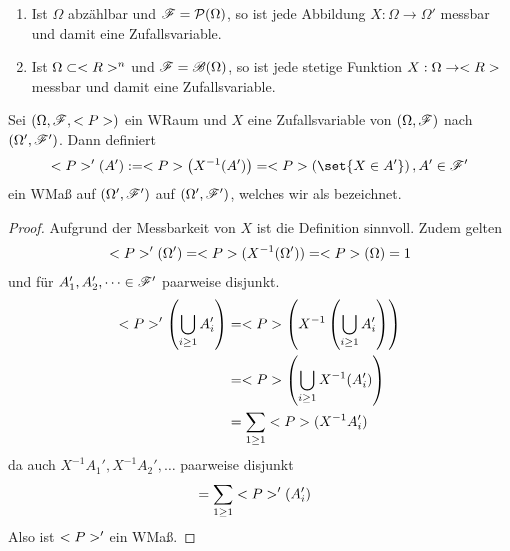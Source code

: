 \begin{example}
	\begin{enumerate}
		\item Ist $\Omega$ abzählbar und $\mathscr{F} = \mathcal{P}(\Omega)$, so ist jede Abbildung $X: \Omega \to \Omega'$ messbar und damit eine Zufallsvariable.
		\item Ist $\Omega \subset <R>^n$ und $\mathscr{F} = \mathscr{B}(\Omega)$, so ist jede stetige Funktion $X: \Omega \to <R>$ messbar und damit eine Zufallsvariable.
	\end{enumerate}
\end{example}

\begin{proposition}
	Sei $(\Omega, \mathscr{F}, <P>)$ ein WRaum und $X$ eine Zufallsvariable von $(\Omega, \mathscr{F})$ nach $(\Omega', \mathscr{F}')$. Dann definiert
	\begin{align}
		\probp'(A') := \probp\left(X^{-1}(A')\right) = \probp\left(\set{X \in A'}\right), A' \in \sigF'\notag
	\end{align}
	ein WMaß auf $(\Omega', \mathscr{F}')$ auf $(\Omega', \mathscr{F}')$, welches wir als  bezeichnet.
\end{proposition}

\begin{proof}
	Aufgrund der Messbarkeit von $X$ ist die Definition sinnvoll. Zudem gelten
	\begin{align}
		<P>'(\Omega') = <P>(X^{-1}(\Omega')) = <P>(\Omega) = 1\notag
	\end{align}
	und für $A_1', A_2', \dots \in \mathscr{F}'$ paarweise disjunkt.
	\begin{align}
		<P>'\left( \bigcup_{i \ge 1} A_i'\right) &= <P>\left(X^{-1}\left( \bigcup_{i \ge 1} A_i' \right)\right) \notag \\
		&= <P>\left( \bigcup_{i \ge 1} X^{-1}(A_i') \right) \notag \\
		&= \sum_{1 \ge 1} <P>(X^{-1}A_i') \notag
	\end{align}
	da auch $X^{-1}A_1', X^{-1}A_2', \dots$ paarweise disjunkt
	\begin{align}
		&= \sum_{1 \ge 1} <P>'(A_i')\notag
	\end{align}
	Also ist $<P>'$ ein WMaß. %
\end{proof}

